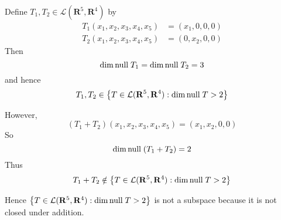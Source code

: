 \documentclass[a5paper]{article}
\begin{document}
\newcommand    \C  { \mathbf{C} }
\newcommand    \R  { \mathbf{R} }
\renewcommand  \L  { \mathcal{L} }
\newcommand    \F  { \mathbf{F} }

Define $T_1, T_2 \in \L(\R^5, \R^4)$ by
\begin{align*}
    T_1(x_1,x_2,x_3,x_4,x_5) &= (x_1, 0, 0, 0)    \\
    T_2(x_1,x_2,x_3,x_4,x_5) &= (0, x_2, 0, 0)
\end{align*}
Then
\begin{equation*}
    \dim\text{null\;}T_1 = \dim\text{null\;}T_2 = 3
\end{equation*}
and hence
\begin{equation*}
    T_1, T_2 \in \left\{ T \in \L(\R^5,\R^4) : \dim\text{null\;}T > 2 \right\}
\end{equation*}

However,
\begin{equation*}
    (T_1+T_2)(x_1,x_2,x_3,x_4,x_5) = (x_1, x_2, 0, 0)
\end{equation*}
So
\begin{equation*}
        \dim\text{null\;}(T_1+T_2) = 2
\end{equation*}
Thus
\begin{equation*}
    T_1+T_2 \notin \left\{T\in\L(\R^5,\R^4):\dim\text{null\;}T>2\right\}
\end{equation*}

Hence $\left\{T\in\L(\R^5,\R^4):\dim\text{null\;}T>2\right\}$ is not a subspace because it is not closed under addition.
\end{document}
